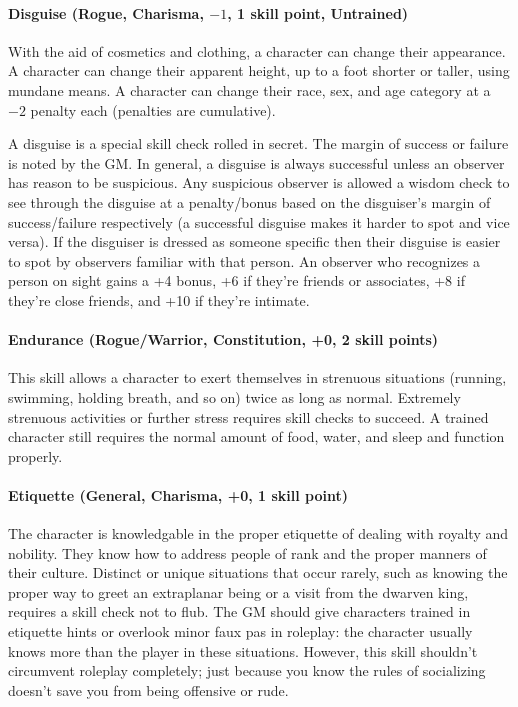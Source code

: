 \begin{multicols}{2}
\paragraph{Disguise (Rogue, Charisma, $-1$, 1 skill point, Untrained)}

With the aid of cosmetics and clothing, a character can change their appearance.  A character can change their apparent height, up to a foot shorter or taller, using mundane means.  A character can change their race, sex, and age category at a $-2$ penalty each (penalties are cumulative).  

A disguise is a special skill check rolled in secret. The margin of success or failure is noted by the GM.  In general, a disguise is always successful unless an observer has reason to be suspicious.  Any suspicious observer is allowed a wisdom check to see through the disguise at a penalty/bonus based on the disguiser's margin of success/failure respectively (a successful disguise makes it harder to spot and vice versa).  If the disguiser is dressed as someone specific then their disguise is easier to spot by observers familiar with that person.  An observer who recognizes a person on sight gains a +4 bonus, +6 if they're friends or associates, +8 if they're close friends, and +10 if they're intimate.

\paragraph{Endurance (Rogue/Warrior, Constitution, +0, 2 skill points)}

This skill allows a character to exert themselves in strenuous situations (running, swimming, holding breath, and so on) twice as long as normal.  Extremely strenuous activities or further stress requires skill checks to succeed.  A trained character still requires the normal amount of food, water, and sleep and function properly. 

\paragraph{Etiquette (General, Charisma, +0, 1 skill point)}

The character is knowledgable in the proper etiquette of dealing with royalty and nobility.  They know how to address people of rank and the proper manners of their culture.  Distinct or unique situations that occur rarely, such as knowing the proper way to greet an extraplanar being or a visit from the dwarven king, requires a skill check not to flub.  The GM should give characters trained in etiquette hints or overlook minor faux pas in roleplay: the character usually knows more than the player in these situations.  However, this skill shouldn't circumvent roleplay completely; just because you know the rules of socializing doesn't save you from being offensive or rude.


\end{multicols}
